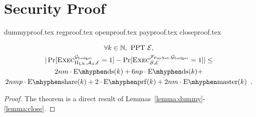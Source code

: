 \section{Security Proof}
  \label{appendix:secproof}
  {dummyproof.tex}
  {regproof.tex}
  {openproof.tex}
  {payproof.tex}
  {closeproof.tex}

  \begin{theorem}
    \label{theorem:simulation}
    \begin{gather*}
      \forall k \in \mathbb{N}, \text{ PPT } \environment, \\
      |\Pr[\textsc{Exec}^{\ledger}_{\Pi_{\mathrm{LN}}, \adversary_{\mathrm{d}},
      \environment} = 1] - \Pr[\textsc{Exec}^{\fpaynet, \ledger}_{\simulator,
      \environment} = 1]| \leq \\
      2nm \cdot \mathrm{E \mhyphen ds}(k) + 6np \cdot \mathrm{E \mhyphen ds}(k) +
      \\
      2nmp \cdot \mathrm{E \mhyphen share}(k) + 2 \cdot \mathrm{E \mhyphen
      prf}(k) + 2nm \cdot \mathrm{E \mhyphen master}(k) \enspace.
    \end{gather*}
  \end{theorem}

  \begin{proof}
    The theorem is a direct result of
    Lemmas~\ref{lemma:dummy}-\ref{lemma:close}.
  \end{proof}
